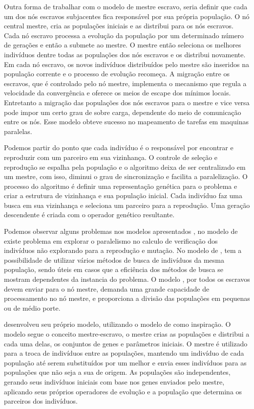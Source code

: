 Outra forma de trabalhar com o modelo de mestre escravo, seria definir que cada um dos nós escravos subjacentes fica responsável por sua própria população. O nó central mestre, cria as populações iniciais e as distribui para os nós escravos. Cada nó escravo processa a evolução da população por um determinado número de gerações e então a submete ao mestre. O mestre então seleciona os melhores indivíduos dentre todas as populações dos nós escravos e os distribui novamente. Em cada nó escravo, os novos indivíduos distribuídos pelo mestre são inseridos na população corrente e o processo de evolução recomeça. A migração entre os escravos, que é controlado pelo nó mestre, implementa o mecanismo que regula a velocidade da convergência e oferece os meios de escape dos mínimos locais. Entretanto a migração das populações dos nós escravos para o mestre e vice versa pode impor um certo grau de sobre carga, dependente do meio de comunicação entre os nós. Esse modelo obteve sucesso no mapeamento de tarefas em maquinas paralelas. \cite{Alaoui}

Podemos partir do ponto que cada indivíduo é o responsável por encontrar e reproduzir com um parceiro em sua vizinhança. O controle de seleção e reprodução se espalha pela população e o algoritmo deixa de ser centralizado em um mestre, com isso, diminui o grau de sincronização e facilita a paralelização. O processo do algoritmo é definir uma representação genética para o problema e criar a estrutura de vizinhança e sua população inicial. Cada indivíduo faz uma busca em sua vizinhança e seleciona um parceiro para a reprodução. Uma geração descendente é criada com o operador genético resultante. \cite{Heinz}

Podemos observar alguns problemas nos modelos apresentados \cite{Vilson}, no modelo de \cite{Jason} existe problema em explorar o paralelismo no calculo de verificação dos indivíduos não explorando para a reprodução e mutação. No modelo de \cite{Heinz}, tem a possibilidade de utilizar vários métodos de busca de indivíduos da mesma população, sendo úteis em casos que a eficiência dos métodos de busca se mostram dependentes da instancia do problema. O modelo \cite{Alaoui}, por todos os escravos devem enviar para o nó mestre, demanda uma grande capacidade de processamento no nó mestre, e proporciona a divisão das populações em pequenas ou de médio porte.

 \cite{Vilson} desenvolveu seu próprio modelo, utilizando o modelo de \cite{Alaoui} como inspiração. O modelo segue o conceito mestre-escravo, o mestre crias as populações e distribui a cada uma delas, os conjuntos de genes e parâmetros iniciais. O mestre é utilizado para a troca de indivíduos entre as populações, mantendo um indivíduo de cada população até serem substituídos por um melhor e envia esses indivíduos para as populações que não seja a sua de origem. As populações são independentes, gerando seus indivíduos iniciais com base nos genes enviados pelo mestre, aplicando seus próprios operadores de evolução e a população que determina os parceiros dos indivíduos.